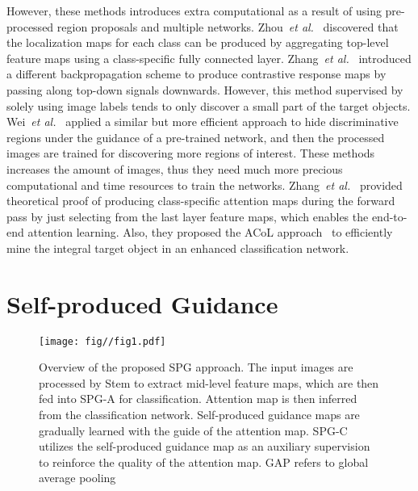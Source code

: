 \documentclass[runningheads]{llncs}
\newcommand{\etal}{\emph{et al.}}
\begin{document}
However, these methods introduces extra computational as a result of using pre-processed region proposals and multiple networks.
Zhou~\etal~\cite{zhou2015cnnlocalization} discovered that the localization maps for each class can be produced by aggregating top-level feature maps using a class-specific fully connected layer.
Zhang~\etal~\cite{zhang2016top} introduced a different backpropagation scheme to produce contrastive response maps by passing along top-down signals downwards.
However, this method supervised by solely using image labels tends to only discover a small part of the target objects.
Wei~\etal~\cite{wei2017object} applied a similar but more efficient approach to hide discriminative regions under the guidance of a pre-trained network, and then the processed images are trained for discovering more regions of interest.
These methods increases the amount of images, thus they need much more precious computational and time resources to train the networks.
Zhang~\etal~\cite{zhang2018adversarial} provided theoretical proof of producing class-specific attention maps during the forward pass by just selecting from the last layer feature maps, which enables the end-to-end attention learning.
Also, they proposed the ACoL approach~\cite{zhang2018adversarial} to efficiently mine the integral target object in an enhanced classification network.

 \section{Self-produced Guidance}\label{sec-spg}
\begin{figure*}[t]
  \centering
  \texttt{[image: fig//fig1.pdf]}
  \caption{Overview of the proposed SPG approach. The input images are processed by Stem to extract mid-level feature maps, which are then fed into SPG-A for classification. Attention map is then inferred from the classification network. Self-produced guidance maps are gradually learned with the guide of the attention map.
SPG-C utilizes the self-produced guidance map as an auxiliary supervision to reinforce the quality of the attention map. GAP refers to global average pooling}\label{fig-1}
\end{figure*}
\end{document}
